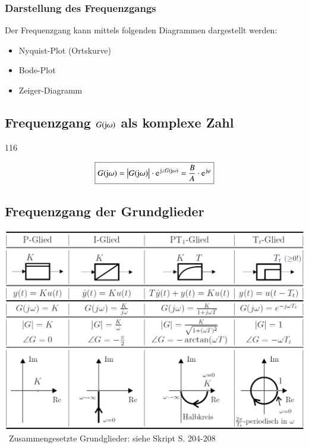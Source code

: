 \subsubsection*{Darstellung des Frequenzgangs}

Der Frequenzgang kann mittels folgenden Diagrammen dargestellt werden: 

\begin{itemize}
    \item Nyquist-Plot (Ortskurve)
    \item Bode-Plot
    \item Zeiger-Diagramm
\end{itemize}


\subsection[Frequenzgang G(j omega) als komplexe Zahl]{Frequenzgang $G(\mathrm{j} \omega)$ als komplexe Zahl}{116}

\vspace{-0.3cm} %
$$ \boxed{ G(\jimg \omega) =  \abs{G(\jimg \omega)} \cdot \e^{\jimg \angle G(\jimg \omega)} = \frac{B}{A} \cdot \e^{\jimg  \varphi} } $$


\subsection{Frequenzgang der Grundglieder}

\includegraphics[width=\columnwidth]{images/frequenzgaenge_grundglieder.png} \\
\textrightarrow\ Zusammengesetzte Grundglieder: siehe Skript S. 204-208


